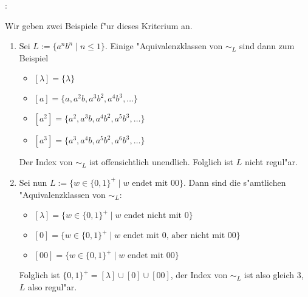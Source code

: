 \example:{
  Wir geben zwei Beispiele f"ur dieses Kriterium an.
  \begin{enumerate}
    \item Sei $L := \{a^nb^n \mid n \leq 1\}$. Einige "Aquivalenzklassen
      von $\sim_L$ sind dann zum Beispiel
      \begin{itemize}
      \item $[\lambda] = \{\lambda\}$
      \item $[a] = \{a, a^2b, a^3b^2, a^4b^3, \dots\}$
      \item $[a^2] = \{a^2, a^3b, a^4b^2, a^5b^3, \dots\}$
      \item $[a^3] = \{a^3, a^4b, a^5b^2, a^6b^3, \dots\}$
      \end{itemize}
      Der Index von $\sim_L$ ist offensichtlich unendlich. Folglich ist
      $L$ nicht regul"ar.
    \item Sei nun $L := \{w \in \{0, 1\}^+ \mid w \text{ endet mit
       	00}\}$. Dann sind die s"amtlichen "Aquivalenzklassen von $\sim_L$:
      \begin{itemize}
      \item $[\lambda] = \{w \in \{0, 1\}^+ \mid w \text{ endet nicht mit
       	  0}\}$
      \item $[0] = \{w \in \{0, 1\}^+ \mid w \text{ endet mit 0, aber
       	  nicht mit 00}\}$
      \item $[00] = \{w \in \{0, 1\}^+ \mid w \text{ endet mit 00}\}$
      \end{itemize}
      Folglich ist $\{0, 1\}^+ = [\lambda] \cup [0] \cup [00]$, der Index
      von $\sim_L$ ist also gleich 3, $L$ also regul"ar.
    \end{enumerate}
  }
